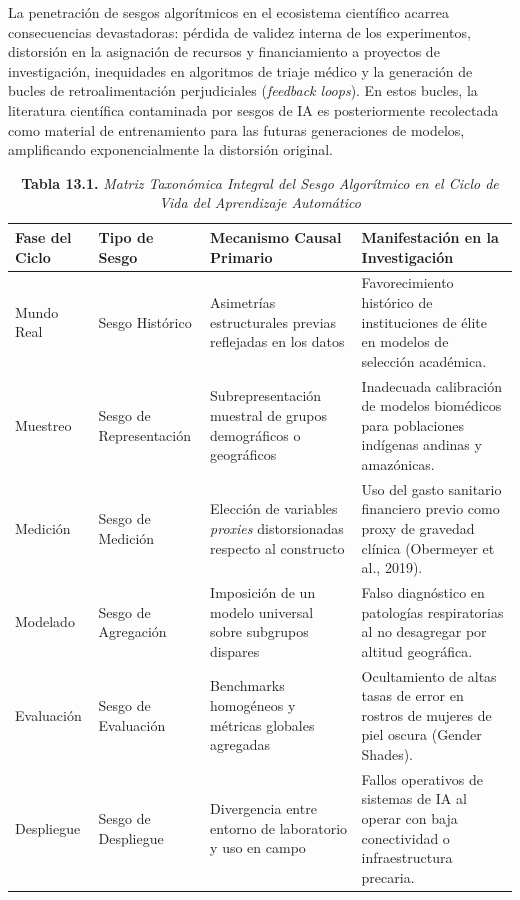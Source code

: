 La penetración de sesgos algorítmicos en el ecosistema científico acarrea consecuencias devastadoras: pérdida de validez interna de los experimentos, distorsión en la asignación de recursos y financiamiento a proyectos de investigación, inequidades en algoritmos de triaje médico y la generación de bucles de retroalimentación perjudiciales (\textit{feedback loops}). En estos bucles, la literatura científica contaminada por sesgos de IA es posteriormente recolectada como material de entrenamiento para las futuras generaciones de modelos, amplificando exponencialmente la distorsión original.

\begin{table}[htpb!]
\centering
\small
\renewcommand{\arraystretch}{1.4}
\begin{tcolorbox}[colback=white, colframe=unmsm_gold, arc=3pt, boxrule=0.8pt, top=0.2cm, bottom=0.2cm, left=0.3cm, right=0.3cm]
\caption*{\textbf{Tabla 13.1.} \textit{Matriz Taxonómica Integral del Sesgo Algorítmico en el Ciclo de Vida del Aprendizaje Automático}}
\begin{tabularx}{\textwidth}{l p{3.2cm} p{4.2cm} X}
\toprule
\textbf{Fase del Ciclo} & \textbf{Tipo de Sesgo} & \textbf{Mecanismo Causal Primario} & \textbf{Manifestación en la Investigación} \\
\midrule
Mundo Real & Sesgo Histórico & Asimetrías estructurales previas reflejadas en los datos & Favorecimiento histórico de instituciones de élite en modelos de selección académica. \\
Muestreo & Sesgo de Representación & Subrepresentación muestral de grupos demográficos o geográficos & Inadecuada calibración de modelos biomédicos para poblaciones indígenas andinas y amazónicas. \\
Medición & Sesgo de Medición & Elección de variables \textit{proxies} distorsionadas respecto al constructo & Uso del gasto sanitario financiero previo como proxy de gravedad clínica (Obermeyer et al., 2019). \\
Modelado & Sesgo de Agregación & Imposición de un modelo universal sobre subgrupos dispares & Falso diagnóstico en patologías respiratorias al no desagregar por altitud geográfica. \\
Evaluación & Sesgo de Evaluación & Benchmarks homogéneos y métricas globales agregadas & Ocultamiento de altas tasas de error en rostros de mujeres de piel oscura (Gender Shades). \\
Despliegue & Sesgo de Despliegue & Divergencia entre entorno de laboratorio y uso en campo & Fallos operativos de sistemas de IA al operar con baja conectividad o infraestructura precaria. \\

\end{tabularx}
\end{tcolorbox}
\end{table}
